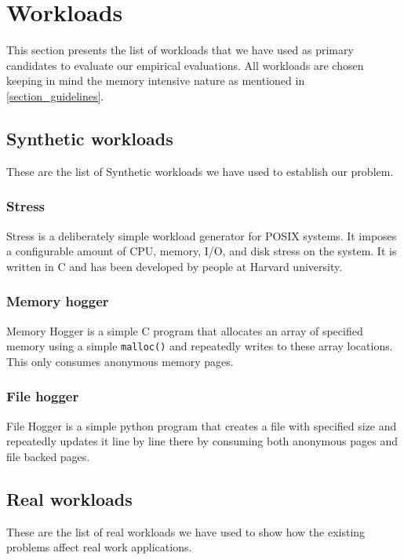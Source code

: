   \section{Workloads}
  
    This section presents the list of workloads that we have used as primary candidates to evaluate our empirical evaluations. All 
workloads are chosen keeping in mind the memory intensive nature as mentioned in \ref{section_guidelines}.  
    
    \subsection{Synthetic workloads}
    
      These are the list of Synthetic workloads we have used to establish our problem.
      
      \subsubsection{Stress}
	Stress \cite{stress} is a deliberately simple workload generator for POSIX systems. It imposes a configurable amount of CPU, 
memory, I/O, and disk stress on the system. It is written in C and has been developed by people at Harvard university. 
      
      \subsubsection{Memory hogger}
	Memory Hogger is a simple C program that allocates an array of specified memory using a simple \texttt{malloc()} and repeatedly 
writes to these array locations. This only consumes anonymous memory pages.
      
      \subsubsection{File hogger}
	File Hogger is a simple python program that creates a file with specified size and repeatedly updates it line by line there by 
consuming both anonymous pages and file backed pages.

    \subsection{Real workloads}
    
      These are the list of real workloads we have used to show how the existing problems affect real work applications.
      
